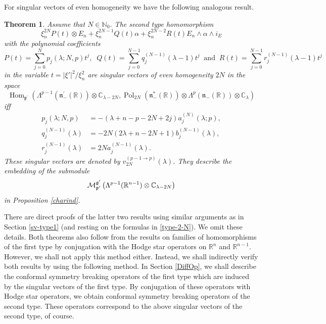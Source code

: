 \documentclass[a4paper,12pt,reqno]{amsart}
\newtheorem{theorem}{Theorem}
\numberwithin{theorem}{subsection}
\numberwithin{equation}{section}
\begin{document}
For singular vectors of even homogeneity we have the following analogous
result.

\begin{theorem}\label{EvenFromPtoP-1} Assume that $N \in {\mathbb{N}}_0$. The second type
homomorphism
\begin{equation}
   \xi_n^{2N} P(t) \otimes E_n + \xi_n^{2N-1} Q(t) \alpha + \xi_n^{2N-2} R(t) E_n \wedge \alpha \wedge i_E
\end{equation}
with the polynomial coefficients
$$
   P(t) = \sum_{j=0}^N p_j(\lambda;N,p) t^j, \;\;
   Q(t) = \sum_{j=0}^{N-1} q^{(N-1)}_j(\lambda\!-\!1)t^j \;\; \mbox{and} \;\;
   R(t) = \sum_{j=0}^{N-1} r^{(N-1)}_j(\lambda\!-\!1)t^j
$$
in the variable $t = {\lvert{\xi'}\rvert}^2/\xi_n^2$ are singular vectors of even
homogeneity $2N$ in the space
$$
   {\operatorname{Hom}}_{{{\mathfrak p}}^\prime}(\Lambda^{p-1}({{\mathfrak n}}_-^\prime({\mathbb{R}})) \otimes {\mathbb{C}}_{\lambda-2N},
   {\operatorname{Pol}}_{2N}({{\mathfrak n}}_-^*({\mathbb{R}})) \otimes \Lambda^p({{\mathfrak n}}_-({\mathbb{R}})) \otimes {\mathbb{C}}_\lambda)
$$
iff
\begin{align*}
   p_j(\lambda;N,p) & = -(\lambda\!+\!n\!-\!p\!-\!2N\!+\!2j) a_j^{(N)}(\lambda;p), \\
   q_j^{(N-1)}(\lambda) & = -2N(2\lambda\!+\!n\!-\!2N\!+\!1) b_j^{(N-1)}(\lambda), \\
   r_j^{(N-1)}(\lambda) & = 2N a_j^{(N-1)}(\lambda).
\end{align*}
These singular vectors are denoted by $v^{(p-1 \to p)}_{2N}(\lambda)$. They
describe the embedding of the submodule
$$
   {\fam2 M}^{{{\mathfrak g}}^\prime}_{{{\mathfrak p}}^\prime} \left(\Lambda^{p-1}({\mathbb{R}}^{n-1})\otimes{\mathbb{C}}_{\lambda-2N}\right)
$$
in Proposition \ref{charind}.
\end{theorem}

There are direct proofs of the latter two results using similar arguments as in
Section \ref{sv-type1} (and resting on the formulas in \eqref{type-2-N}). We
omit these details. Both theorems also follow from the results on families of
homomorphisms of the first type by conjugation with the Hodge star operators on
${\mathbb{R}}^n$ and ${\mathbb{R}}^{n-1}$. However, we shall not apply this method either. Instead,
we shall indirectly verify both results by using the following method. In
Section \ref{DiffOp}, we shall describe the conformal symmetry breaking
operators of the first type which are induced by the singular vectors of the
first type. By conjugation of these operators with Hodge star operators, we
obtain conformal symmetry breaking operators of the second type. These
operators correspond to the above singular vectors of the second type, of
course.
\end{document}
